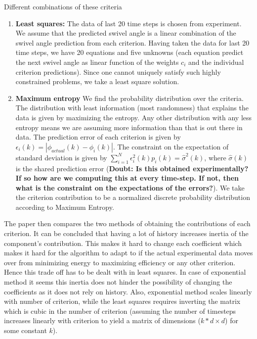 \documentclass{article}[11pt]
\begin{document}
Different combinations of these criteria
\begin{enumerate}
\item \textbf{Least squares:} The data of last 20 time steps is chosen from experiment. We assume that the predicted swivel angle is a linear combination of the swivel angle prediction from each criterion. Having taken the data for last 20 time steps, we have 20 equations and five unknowns (each equation predict the next swivel angle as linear function of the weights $c_i$ and the individual criterion predictions). Since one cannot uniquely satisfy such highly constrained problems, we take a least square solution. 
\item \textbf{Maximum entropy} We find the probability distribution over the criteria. The distribution with least information (most randomness) that explains the data is given by maximizing the entropy. Any other distribution with any less entropy means we are assuming more information than that is out there in data. The prediction error of each criterion is given by $\epsilon_i(k) = |\phi_{actual}(k) - \phi_i(k)|$. The constraint on the expectation of standard deviation is given by $\sum_{i=1}^{N}\epsilon_{i}^{2}(k) p_{i}(k) = \hat{\sigma}^{2}(k)$, where  $\hat{\sigma}(k)$ is the shared prediction error (\textbf{Doubt: Is this obtained experimentally? If so how are we computing this at every time-step. If not, then what is the constraint on the expectations of the errors?}). We take the criterion contribution to be a normalized discrete probability distribution according to Maximum Entropy.

\end{enumerate}

The paper then compares the two methods of obtaining the contributions of each criterion. It can be concluded that having a lot of history increases inertia of the component's contribution. This makes it hard to change each coefficient which makes it hard for the algorithm to adapt to if the actual experimental data moves over from minimizing energy to maximizing efficiency or any other criterion. Hence this trade off has to be dealt with in least squares. In case of exponential method it seems this inertia does not hinder the possibility of changing the coefficients as it does not rely on history. Also, exponential method scales linearly with number of criterion, while the least squares requires inverting the matrix which is cubic in the number of criterion (assuming the number of timesteps increases linearly with criterion to yield a matrix of dimensions ($k*d \times d$) for some constant $k$). 
\end{document}
